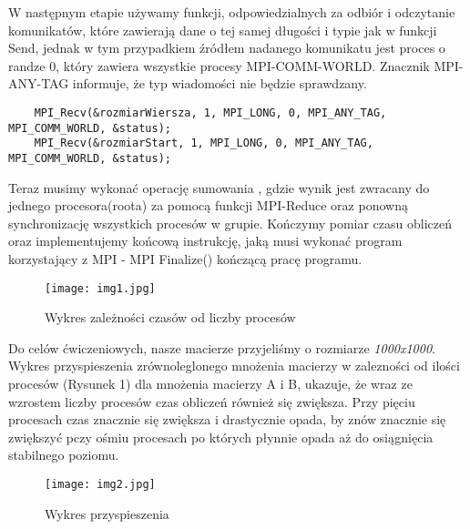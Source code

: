 \documentclass[a4paper,12pt]{article}
\begin{document}
W następnym etapie używamy funkcji, odpowiedzialnych za odbiór i odczytanie komunikatów, które zawierają dane o tej samej długości i typie jak w funkcji Send, jednak w tym przypadkiem źródłem nadanego komunikatu jest proces o randze 0, który zawiera wszystkie procesy MPI-COMM-WORLD. Znacznik MPI-ANY-TAG informuje, że typ wiadomości nie będzie sprawdzany.
\begin{lstlisting}
	MPI_Recv(&rozmiarWiersza, 1, MPI_LONG, 0, MPI_ANY_TAG, MPI_COMM_WORLD, &status);		
	MPI_Recv(&rozmiarStart, 1, MPI_LONG, 0, MPI_ANY_TAG, MPI_COMM_WORLD, &status);
\end{lstlisting}
Teraz musimy wykonać operację sumowania , gdzie wynik jest zwracany do jednego procesora(roota) za pomocą funkcji MPI-Reduce oraz ponowną synchronizację wszystkich procesów w grupie. Kończymy pomiar czasu obliczeń oraz implementujemy końcową instrukcję, jaką musi wykonać program korzystający z MPI - MPI Finalize() kończącą pracę programu.


\begin{wrapfigure}{r}{0.5\textwidth}
	\vspace{-40pt}
	\begin{center}
		\texttt{[image: img1.jpg]}
	\end{center}
	\vspace{-20pt}
	\caption{Wykres zależności czasów od liczby procesów}
	\vspace{25pt}
\end{wrapfigure}

Do celów ćwiczeniowych, nasze macierze przyjeliśmy o rozmiarze \textit{1000x1000}. Wykres przyspieszenia zrównoleglonego mnożenia macierzy w zalezności od ilości procesów (Rysunek 1) dla mnożenia macierzy A i B, ukazuje, że wraz ze wzrostem liczby procesów czas obliczeń również się zwiększa. Przy pięciu procesach czas znacznie się zwiększa i drastycznie opada, by znów znacznie się zwiększyć pczy ośmiu procesach po których płynnie opada aż do osiągnięcia stabilnego poziomu. 



\begin{wrapfigure}{r}{0.5\textwidth}
	\vspace{-40pt}
	\begin{center}
		\texttt{[image: img2.jpg]}
	\end{center}
	\vspace{-20pt}
	\caption{Wykres przyspieszenia}
	\vspace{35pt}
\end{wrapfigure}
\end{document}
